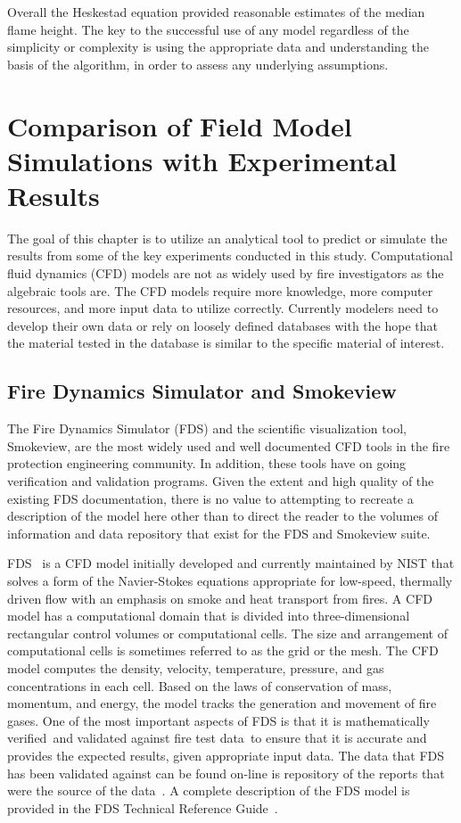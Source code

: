 \documentclass[twoside]{uocthesis}
\begin{document}
{Overall the Heskestad equation provided reasonable estimates of the median flame height.  The key to the successful use of any model regardless of the simplicity or complexity is using the appropriate data and understanding the basis of the algorithm, in order to assess any underlying assumptions. 

\chapter{Comparison of Field Model Simulations with Experimental Results}

The goal of this chapter is to utilize an analytical tool to predict or simulate the results from some of the key experiments conducted in this study.  Computational fluid dynamics (CFD) models are not as widely used by fire investigators as the algebraic tools are.  The CFD models require more knowledge, more computer resources, and more input data to utilize correctly.  Currently modelers need to develop their own data or rely on loosely defined databases with the hope that the material tested in the database is similar to the specific material of interest.       

\section{Fire Dynamics Simulator and Smokeview}

The Fire Dynamics Simulator (FDS) and the scientific visualization tool, Smokeview, are the most widely used and well documented CFD tools in the fire protection engineering community. In addition, these tools have on going verification and validation programs.  Given the extent and high quality of the existing FDS documentation, there is no value to attempting to recreate a description of the model here other than to direct the reader to the volumes of information and data repository that exist for the FDS and Smokeview suite.

FDS~\cite{FDS_Users_Guide} is a CFD model initially developed and currently maintained by NIST that solves a form of the Navier-Stokes equations appropriate for low-speed, thermally driven flow with an emphasis on smoke and heat transport from fires. A CFD model has a computational domain that is divided into  three-dimensional rectangular control volumes or computational cells. The size and arrangement of computational cells is sometimes referred to as the grid or the mesh.  The CFD model computes the density, velocity, temperature, pressure, and gas concentrations in each cell. Based on the laws of conservation of mass, momentum, and energy, the model tracks the generation and movement of fire gases. One of the most important aspects of FDS is that it is mathematically verified~\cite{FDS_Verification_Guide}and validated against fire test data~\cite{FDS_Validation_Guide}to ensure that it is accurate and provides the expected results, given appropriate input data.  The data that FDS has been validated against can be found on-line is repository of the reports that were the source of the data~\cite{FDS-SMV_repository}. A complete description of the FDS model is provided in the FDS Technical Reference Guide~\cite{FDS_Tech_Guide}.  

}
\end{document}
